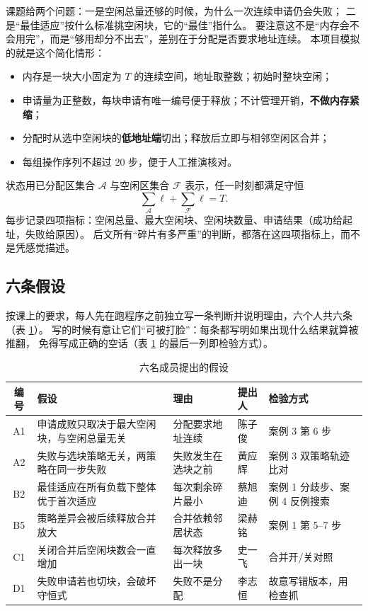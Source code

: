 \documentclass[12pt,a4paper]{ctexart}
\begin{document}
课题给两个问题：一是空闲总量还够的时候，为什么一次连续申请仍会失败；
二是“最佳适应”按什么标准挑空闲块，它的“最佳”指什么。
要注意这不是“内存会不会用完”，而是“够用却分不出去”，差别在于分配是否要求地址连续。
本项目模拟的就是这个简化情形：

\begin{itemize}
    \item 内存是一块大小固定为 $T$ 的连续空间，地址取整数；初始时整块空闲；
    \item 申请量为正整数，每块申请有唯一编号便于释放；不计管理开销，\textbf{不做内存紧缩}；
    \item 分配时从选中空闲块的\textbf{低地址端}切出；释放后立即与相邻空闲区合并；
    \item 每组操作序列不超过 20 步，便于人工推演核对。
\end{itemize}

状态用已分配区集合 $\mathcal{A}$ 与空闲区集合 $\mathcal{F}$ 表示，任一时刻都满足守恒
\begin{equation}
    \sum_{\mathcal{A}}\ell+\sum_{\mathcal{F}}\ell=T .
    \label{eq:cons}
\end{equation}
每步记录四项指标：空闲总量、最大空闲块、空闲块数量、申请结果（成功给起址，失败给原因）。
后文所有“碎片有多严重”的判断，都落在这四项指标上，而不是凭感觉描述。

\subsection{六条假设}

按课上的要求，每人先在跑程序之前独立写一条判断并说明理由，六个人共六条（表 \ref{tab:hypo}）。
写的时候有意让它们“可被打脸”：每条都写明如果出现什么结果就算被推翻，
免得写成正确的空话（表 \ref{tab:hypo} 的最后一列即检验方式）。

\begin{table}[htbp]
    \centering
    \caption{六名成员提出的假设}
    \label{tab:hypo}
    \footnotesize
    \setlength{\tabcolsep}{4pt}
    \begin{tabularx}{\textwidth}{@{}c>{\raggedright\arraybackslash}X>{\raggedright\arraybackslash}X>{\raggedright\arraybackslash}p{1.5cm}>{\raggedright\arraybackslash}p{3.6cm}@{}}
        \toprule
        编号 & 假设 & 理由 & 提出人 & 检验方式 \\
        \midrule
        A1 & 申请成败只取决于最大空闲块，与空闲总量无关 & 分配要求地址连续 & 陈子俊 & 案例 3 第 6 步 \\
        A2 & 失败与选块策略无关，两策略在同一步失败 & 失败发生在选块之前 & 黄应辉 & 案例 3 双策略轨迹比对 \\
        B2 & 最佳适应在所有负载下整体优于首次适应 & 每次剩余碎片最小 & 蔡旭迪 & 案例 1 分歧步、案例 4 反例搜索 \\
        B5 & 策略差异会被后续释放合并放大 & 合并依赖邻居状态 & 梁赫铭 & 案例 1 第 5--7 步 \\
        C1 & 关闭合并后空闲块数会一直增加 & 每次释放多出一块 & 史一飞 & 合并开/关对照 \\
        D1 & 失败申请若也切块，会破坏守恒式 & 失败不是分配 & 李志恒 & 故意写错版本，用检查抓 \\
        \bottomrule
    \end{tabularx}
\end{table}
\end{document}
